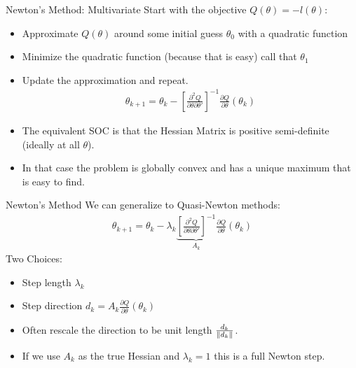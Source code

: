 \documentclass[aspectratio=169,11pt]{beamer}
\begin{document}
\begin{frame}{Newton's Method: Multivariate}
Start with the objective $Q(\theta) = - l(\theta)$:
\begin{itemize}
\item Approximate $Q(\theta)$ around some initial guess $\theta_0$ with a quadratic function
\item Minimize the quadratic function (because that is easy) call that $\theta_1$
\item Update the approximation and repeat.
\begin{align*}
\theta_{k+1} = \theta_k - \left[ \frac{\partial^2 Q}{\partial \theta \partial \theta'} \right]^{-1}\frac{\partial Q}{\partial \theta}(\theta_k)
\end{align*}
\item The equivalent SOC is that the {Hessian Matrix} is \alert{positive semi-definite}  (ideally at all $\theta$).
\item In that case the problem is \alert{globally convex} and has a \alert{unique maximum} that is easy to find.
\end{itemize}
\end{frame}


\begin{frame}{Newton's Method}
We can generalize to Quasi-Newton methods:
\begin{align*}
\theta_{k+1} = \theta_k -  \lambda_k \underbrace{\left[ \frac{\partial^2 Q}{\partial \theta \partial \theta'} \right]^{-1}}_{A_k} \frac{\partial Q}{\partial \theta}(\theta_k)
\end{align*}
Two Choices:
\begin{itemize}
\item Step length $\lambda_k$
\item Step direction $d_k=A_k \frac{\partial Q}{\partial \theta}(\theta_k)$
\item Often rescale the direction to be unit length $\frac{d_k}{\lVert d_k\rVert}$.
\item If we use $A_k$ as the true Hessian and $\lambda_k=1$ this is a \alert{full Newton step}.
\end{itemize}
\end{frame}
\end{document}
